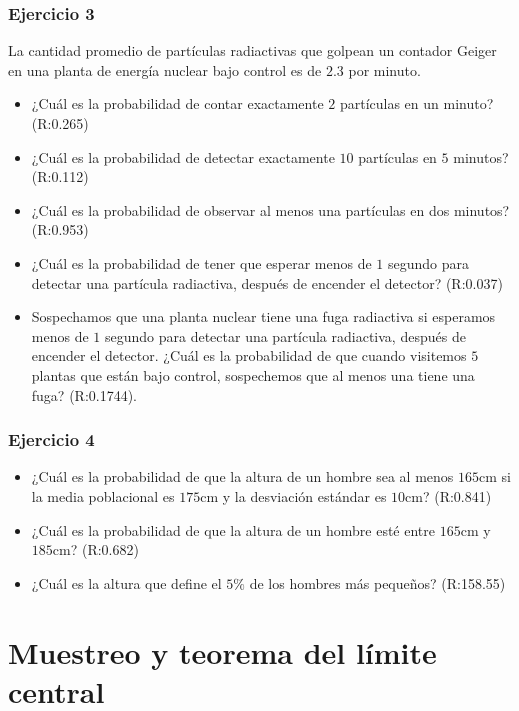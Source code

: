 \documentclass[
]{book}
\begin{document}
\hypertarget{ejercicio-3-2}{%
\subsubsection{Ejercicio 3}\label{ejercicio-3-2}}

La cantidad promedio de partículas radiactivas que golpean un contador Geiger en una planta de energía nuclear bajo control es de \(2.3\) por minuto.

\begin{itemize}
\item
  ¿Cuál es la probabilidad de contar exactamente \(2\) partículas en un minuto? (R:0.265)
\item
  ¿Cuál es la probabilidad de detectar exactamente \(10\) partículas en \(5\) minutos? (R:0.112)
\item
  ¿Cuál es la probabilidad de observar al menos una partículas en dos minutos? (R:0.953)
\item
  ¿Cuál es la probabilidad de tener que esperar menos de \(1\) segundo para detectar una partícula radiactiva, después de encender el detector? (R:0.037)
\item
  Sospechamos que una planta nuclear tiene una fuga radiactiva si esperamos menos de \(1\) segundo para detectar una partícula radiactiva, después de encender el detector. ¿Cuál es la probabilidad de que cuando visitemos \(5\) plantas que están bajo control, sospechemos que al menos una tiene una fuga? (R:0.1744).
\end{itemize}

\hypertarget{ejercicio-4-2}{%
\subsubsection{Ejercicio 4}\label{ejercicio-4-2}}

\begin{itemize}
\item
  ¿Cuál es la probabilidad de que la altura de un hombre sea al menos
  \(165\)cm si la media poblacional es \(175\)cm y la desviación estándar es \(10\)cm? (R:0.841)
\item
  ¿Cuál es la probabilidad de que la altura de un hombre esté entre
  \(165\)cm y \(185\)cm? (R:0.682)
\item
  ¿Cuál es la altura que define el \(5\%\) de los hombres más pequeños? (R:158.55)
\end{itemize}

\hypertarget{muestreo-y-teorema-del-luxedmite-central}{%
\section{Muestreo y teorema del límite central}\label{muestreo-y-teorema-del-luxedmite-central}}
\end{document}
